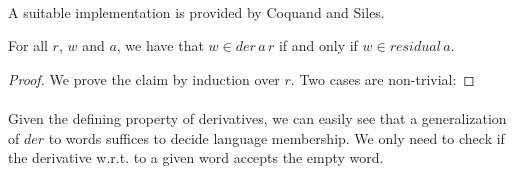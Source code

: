         \paragraph{}
        A suitable implementation is provided by Coquand and Siles.



        \begin{theorem}
            \label{der_correct}
            For all $r$, $w$ and $a$, we have that $w \in der \, a \, r$ if and only if $w \in residual \, a $.
        \end{theorem}

        \begin{proof}
            We prove the claim by induction over $r$. Two cases are non-trivial: 
        \end{proof}

        \paragraph{} 
        Given the defining property of derivatives, we can easily see that a generalization of $der$ to words suffices to decide language membership. We only need to check if the derivative w.r.t. to a given word accepts the empty word.

